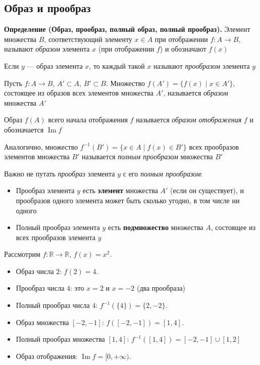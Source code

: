\documentclass[a4paper,12pt]{article}
\theoremstyle{definition}
\theoremstyle{plain}
\theoremstyle{remark}
\begin{document}
	\subsection{Образ и прообраз}
	
	\noindent \textbf{Определение (Образ, прообраз, полный образ, полный прообраз).}
	Элемент множества $B$, соответствующий элементу $x \in A$ при отображении $f \colon A \to B$, называют \textit{образом} элемента $x$ (при отображении $f$) и обозначают $f(x)$
	
	\medskip
	Если $y$ — образ элемента $x$, то каждый такой $x$ называют \textit{прообразом} элемента $y$
	
	\medskip
	Пусть $f \colon A \to B$, $A' \subset A$, $B' \subset B$. Множество $f(A') = \{f(x) \mid x \in A'\}$, состоящее из образов всех элементов множества $A'$, называется \textit{образом} множества $A'$
	
	\medskip
	Образ $f(A)$ всего начала отображения $f$ называется \textit{образом отображения} $f$ и обозначается $\operatorname{Im} f$
	
	\medskip
	Аналогично, множество $f^{-1}(B') = \{x \in A \mid f(x) \in B'\}$ всех прообразов элементов множества $B'$ называется \textit{полным прообразом} множества $B'$
	
	\begin{tcolorbox}[colback=yellow!5, colframe=orange!60!black, title=Важное различие]
		Важно не путать \textit{прообраз} элемента $y$ с его \textit{полным прообразом}:
		\begin{itemize}
			\item Прообраз элемента $y$ есть \textbf{элемент} множества $A'$ (если он существует), и прообразов одного элемента может быть сколько угодно, в том числе ни одного
			\item Полный прообраз элемента $y$ есть \textbf{подмножество} множества $A$, состоящее из всех прообразов элемента $y$
		\end{itemize}
	\end{tcolorbox}
	
	\begin{tcolorbox}[colback=blue!5, colframe=blue!40!black, title=Пример]
		Рассмотрим $f \colon \mathbb{R} \to \mathbb{R}$, $f(x) = x^2$.
		\begin{itemize}
			\item Образ числа $2$: $f(2) = 4$.
			\item Прообраз числа $4$: это $x = 2$ и $x = -2$ (два прообраза)
			\item Полный прообраз числа $4$: $f^{-1}(\{4\}) = \{2, -2\}$.
			\item Образ множества $[-2, -1]$: $f([-2, -1]) = [1, 4]$.
			\item Полный прообраз множества $[1, 4]$: $f^{-1}([1, 4]) = [-2, -1] \cup [1, 2]$
			\item Образ отображения: $\operatorname{Im} f = [0, +\infty)$.
		\end{itemize}
	\end{tcolorbox}
	
\end{document}
